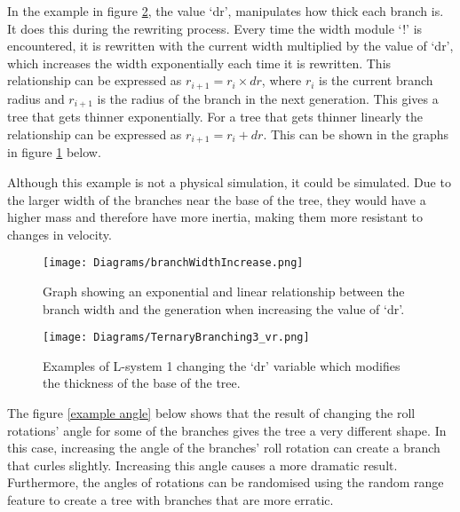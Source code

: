 \vspace{10mm} 

\noindent
In the example in figure \ref{example thickness}, the value `dr', manipulates how thick each branch is. It does this during the rewriting process. Every time the width module `!' is encountered, it is rewritten with the current width multiplied by the value of `dr', which increases the width exponentially each time it is rewritten. This relationship can be expressed as $r_{i+1} = r_i \times dr$, where $r_i$ is the current branch radius and $r_{i+1}$ is the radius of the branch in the next generation. This gives a tree that gets thinner exponentially. For a tree that gets thinner linearly the relationship can be expressed as $r_{i+1} = r_i + dr$. This can be shown in the graphs in figure \ref{graph thickness} below. 

Although this example is not a physical simulation, it could be simulated. Due to the larger width of the branches near the base of the tree, they would have a higher mass and therefore have more inertia, making them more resistant to changes in velocity.

\begin{figure}[htbp]
	{\centering
		\vspace{7px}
		\texttt{[image: Diagrams/branchWidthIncrease.png]}
		\caption{Graph showing an exponential and linear relationship between the branch width and the generation when increasing the value of `dr'.} \label{graph thickness}
	}
\end{figure}
\FloatBarrier

\begin{figure}[htbp]
	{\centering
		\vspace{7px}
		\texttt{[image: Diagrams/TernaryBranching3\_vr.png]} 
		\caption{Examples of L-system 1 changing the `dr' variable which modifies the thickness of the base of the tree.} \label{example thickness}
	}
\end{figure}
\FloatBarrier

\noindent
The figure \ref{example angle} below shows that the result of changing the roll rotations' angle for some of the branches gives the tree a very different shape. In this case, increasing the angle of the branches' roll rotation can create a branch that curles slightly. Increasing this angle causes a more dramatic result. Furthermore, the angles of rotations can be randomised using the random range feature to create a tree with branches that are more erratic. 

